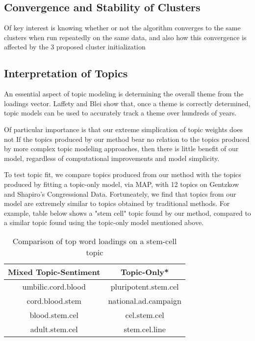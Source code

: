 \documentclass[12pt]{article}
\begin{document}
\subsection{Convergence and Stability of Clusters}

Of key interest is knowing whether or not the algorithm converges to the same clusters when run repeatedly on the same data, and also how this convergence is affected by the 3 proposed cluster initialization 

\subsection{Interpretation of Topics}

An essential aspect of topic modeling is determining the overall theme from the loadings vector. Laffety and Blei show that, once a theme is correctly determined, topic models can be used to accurately track a theme over hundreds of years. 

Of particular importance is that our extreme simplication of topic weights does not 
If the topics produced by our method bear no relation to the topics produced by more complex topic modeling approaches, then there is little benefit of our model, regardless of computational improvements and model simplicity. 

To test topic fit, we compare topics produced from our method with the topics produced by fitting a topic-only model, via MAP, with 12 topics on Gentzkow and Shapiro's Congressional Data. Fortuneately, we find that topics from our model are extremely similar to topics obtained by traditional methods. For example, table below shows a "stem cell" topic found by our method, compared to a similar topic found using the topic-only model mentioned above.

\begin{table}[!htbp]
\caption{Comparison of top word loadings on a stem-cell topic} \label{tab:title}
\centering
\begin{tabular}{  c  c }
Mixed Topic-Sentiment & Topic-Only* \\
\hline
umbilic.cord.blood & pluripotent.stem.cel \\
cord.blood.stem  & national.ad.campaign \\
blood.stem.cel   & cel.stem.cel \\
adult.stem.cel & stem.cel.line \\
\end{tabular}
\end{table}
\end{document}

